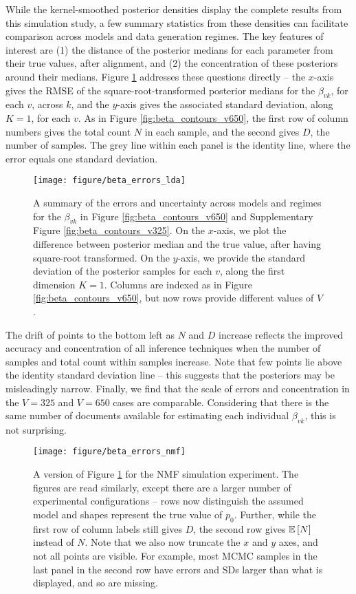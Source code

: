 \documentclass{article}
\begin{document}
While the kernel-smoothed posterior densities display the complete results from
this simulation study, a few summary statistics from these densities can
facilitate comparison across models and data generation regimes. The key
features of interest are (1) the distance of the posterior medians for each
parameter from their true values, after alignment, and (2) the concentration of
these posteriors around their medians. Figure \ref{fig:beta_errors_lda}
addresses these questions directly -- the $x$-axis gives the RMSE of the
square-root-transformed posterior medians for the $\beta_{vk}$, for each $v$,
across $k$, and the $y$-axis gives the associated standard deviation, along $K =
1$, for each $v$. As in Figure \ref{fig:beta_contours_v650}, the first row of
column numbers gives the total count $N$ in each sample, and the second gives
$D$, the number of samples. The grey line within each panel is the identity
line, where the error equals one standard deviation.

\begin{figure}[!p]
  \centering
  \texttt{[image: figure/beta\_errors\_lda]}
  \caption{A summary of the errors and uncertainty across models and regimes for
    the $\beta_{vk}$ in Figure \ref{fig:beta_contours_v650} and Supplementary
    Figure \ref{fig:beta_contours_v325}. On the $x$-axis, we plot the difference
    between posterior median and the true value, after having square-root
    transformed. On the $y$-axis, we provide the standard deviation of the
    posterior samples for each $v$, along the first dimension $K = 1$. Columns
    are indexed as in Figure \ref{fig:beta_contours_v650}, but now rows provide
    different values of $V$.
    \label{fig:beta_errors_lda} }
\end{figure}


The drift of points to the bottom left as $N$ and $D$ increase reflects the
improved accuracy and concentration of all inference techniques when the number
of samples and total count within samples increase. Note that few points lie
above the identity standard deviation line -- this suggests that the posteriors
may be misleadingly narrow. Finally, we find that the scale of errors and
concentration in the $V = 325$ and $V = 650$ cases are comparable. Considering
that there is the same number of documents available for estimating each
individual $\beta_{vk}$, this is not surprising.

\begin{figure}[!p]
  \centering
  \texttt{[image: figure/beta\_errors\_nmf]}
  \caption{A version of Figure \ref{fig:beta_errors_lda} for the NMF simulation
    experiment. The figures are read similarly, except there are a larger number
    of experimental configurations -- rows now distinguish the assumed model and
    shapes represent the true value of $p_{0}$. Further, while the first row of
    column labels still gives $D$, the second row gives $\mathbb{E}\left[{N}\right]$ instead of
    $N$. Note that we also now truncate the $x$ and $y$ axes, and not all points
    are visible. For example, most MCMC samples in the last panel in the second
    row have errors and SDs larger than what is displayed, and so are
    missing. \label{fig:beta_errors_nmf}}
\end{figure}
\end{document}
